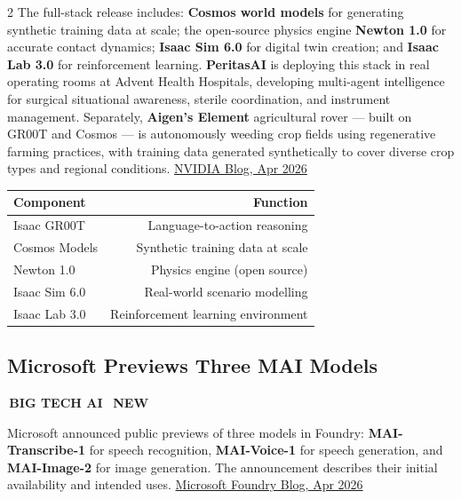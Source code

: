 \documentclass[10pt, a4paper]{article}
\newcommand{\sectiontag}[1]{%
  \noindent\colorbox{cobalt}{%
    \,\footnotesize\bfseries\color{white}\MakeUppercase{#1}\,}\,%
}
\newcommand{\newtag}{%
  \colorbox{emerald}{\,\scriptsize\bfseries\color{white}NEW\,}\ %
}
\begin{document}
\begin{multicols}{2}
{The full-stack release includes: \textbf{Cosmos world models} for generating synthetic training data at scale; the open-source physics engine \textbf{Newton 1.0} for accurate contact dynamics; \textbf{Isaac Sim 6.0} for digital twin creation; and \textbf{Isaac Lab 3.0} for reinforcement learning. \textbf{PeritasAI} is deploying this stack in real operating rooms at Advent Health Hospitals, developing multi-agent intelligence for surgical situational awareness, sterile coordination, and instrument management. Separately, \textbf{Aigen's Element} agricultural rover --- built on GR00T and Cosmos --- is autonomously weeding crop fields using regenerative farming practices, with training data generated synthetically to cover diverse crop types and regional conditions.
\href{https://blogs.nvidia.com/blog/national-robotics-week-2026/}{NVIDIA Blog, Apr 2026}
}
\begin{databox}[title={\faRobot\quad NVIDIA Physical AI Full Stack}]
  \begin{center}
  \begin{tabular}{l r}
    \toprule
    \small\textbf{Component} & \small\textbf{Function} \\
    \midrule
    \small Isaac GR00T     & \small Language-to-action reasoning \\
    \small Cosmos Models   & \small Synthetic training data at scale \\
    \small Newton 1.0      & \small Physics engine (open source) \\
    \small Isaac Sim 6.0   & \small Real-world scenario modelling \\
    \small Isaac Lab 3.0   & \small Reinforcement learning environment \\
    \bottomrule
  \end{tabular}
  \end{center}
\end{databox}


\subsection{Microsoft Previews Three MAI Models}

\sectiontag{Big Tech AI}\quad\newtag

\medskip
{\small
Microsoft announced public previews of three models in Foundry: \textbf{MAI-Transcribe-1} for speech recognition, \textbf{MAI-Voice-1} for speech generation, and \textbf{MAI-Image-2} for image generation. The announcement describes their initial availability and intended uses.
\href{https://techcommunity.microsoft.com/blog/azure-ai-foundry-blog/introducing-mai-transcribe-1-mai-voice-1-and-mai-image-2-in-microsoft-foundry/4507787}{Microsoft Foundry Blog, Apr 2026}
}


\end{multicols}
\end{document}
